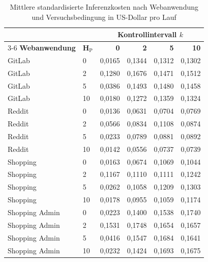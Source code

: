 \begin{table}[htbp]
    \centering
    \footnotesize
    \renewcommand{\arraystretch}{1.12}
    \begin{tabular}{llrrrr}
        \toprule
        & &
        \multicolumn{4}{c}{\textbf{Kontrollintervall \(k\)}} \\
        \cmidrule(lr){3-6}
        \textbf{Webanwendung} &
        \(\boldsymbol{H_{\mathrm{P}}}\) &
        \textbf{0} &
        \textbf{2} &
        \textbf{5} &
        \textbf{10} \\
        \midrule
        GitLab & 0  & 0,0165 & 0,1344 & 0,1312 & 0,1302 \\
        GitLab & 2  & 0,1280 & 0,1676 & 0,1471 & 0,1512 \\
        GitLab & 5  & 0,0386 & 0,1493 & 0,1480 & 0,1458 \\
        GitLab & 10 & 0,0180 & 0,1272 & 0,1359 & 0,1324 \\
        \addlinespace

        Reddit & 0  & 0,0136 & 0,0631 & 0,0704 & 0,0769 \\
        Reddit & 2  & 0,0566 & 0,0834 & 0,1108 & 0,0874 \\
        Reddit & 5  & 0,0233 & 0,0789 & 0,0881 & 0,0892 \\
        Reddit & 10 & 0,0142 & 0,0556 & 0,0737 & 0,0739 \\
        \addlinespace

        Shopping & 0  & 0,0163 & 0,0674 & 0,1069 & 0,1044 \\
        Shopping & 2  & 0,1167 & 0,1110 & 0,1111 & 0,1242 \\
        Shopping & 5  & 0,0262 & 0,1058 & 0,1209 & 0,1303 \\
        Shopping & 10 & 0,0178 & 0,0955 & 0,1059 & 0,1174 \\
        \addlinespace

        Shopping Admin & 0  & 0,0223 & 0,1400 & 0,1538 & 0,1740 \\
        Shopping Admin & 2  & 0,1531 & 0,1748 & 0,1654 & 0,1657 \\
        Shopping Admin & 5  & 0,0416 & 0,1547 & 0,1684 & 0,1641 \\
        Shopping Admin & 10 & 0,0232 & 0,1424 & 0,1693 & 0,1675 \\
        \bottomrule
    \end{tabular}
    \caption{Mittlere standardisierte Inferenzkosten nach
    Webanwendung und Versuchsbedingung in US-Dollar pro Lauf}
    \label{tab:site-kosten-hk}
\end{table}
